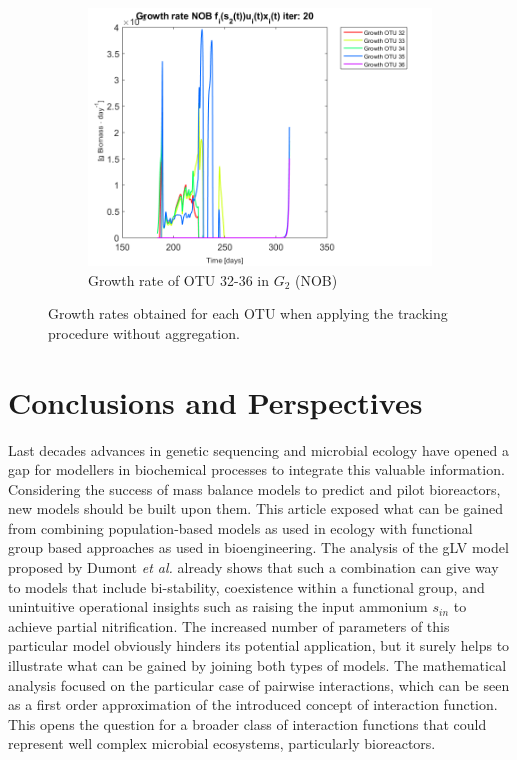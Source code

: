 \documentclass[processes,article,submit,moreauthors,pdftex]{Definitions/mdpi}
\begin{document}
\begin{figure}[h]
\begin{subfigure}{0.45 \textwidth}
		\includegraphics[width =\textwidth]{Application//200407_iter_20_growth_control_NOB_plot_1}
		\caption{Growth rate of OTU 32-36 in $G_2$ (NOB) }
	\end{subfigure}
	\caption{Growth rates obtained for each OTU when applying the tracking procedure without aggregation.}
	\label{growth all}
\end{figure}


\clearpage
\section{Conclusions and Perspectives}

Last decades advances in genetic sequencing and microbial ecology have opened a gap for modellers in biochemical processes to integrate this valuable information. Considering the success of mass balance models to predict and pilot bioreactors, new models should be built upon them. This article exposed what can be gained from combining population-based models as used in ecology with functional group based approaches as used in bioengineering. The analysis of the gLV model proposed by Dumont \textit{et al.} \cite{Dumont2016} already shows that such a combination can give way to models that include bi-stability, coexistence within a functional group, and unintuitive operational insights such as raising the input ammonium $s_{in}$ to achieve partial nitrification. The increased number of parameters of this particular model obviously hinders its potential application, but it surely helps to illustrate what can be gained by joining both types of models. The mathematical analysis focused on the particular case of pairwise interactions, which can be seen as a first order approximation of the introduced concept of interaction function. This opens the question for a broader class of interaction functions that could represent well complex microbial ecosystems, particularly bioreactors. 
\end{document}
